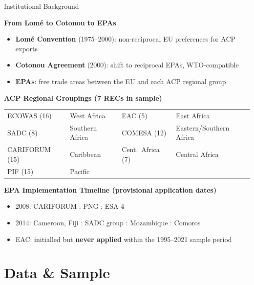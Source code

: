 \documentclass[aspectratio=169,11pt]{beamer}
\begin{document}
\begin{frame}{Institutional Background}

    \textbf{From Lom\'{e} to Cotonou to EPAs}
    \begin{itemize}
        \item \textbf{Lom\'{e} Convention} (1975--2000): non-reciprocal EU preferences for ACP exports
        \item \textbf{Cotonou Agreement} (2000): shift to reciprocal EPAs, WTO-compatible
        \item \textbf{EPAs}: free trade areas between the EU and each ACP regional group
    \end{itemize}

    \medskip

    \textbf{ACP Regional Groupings (7 RECs in sample)}

    \smallskip
    {\small
    \begin{tabular}{ll@{\qquad}ll}
        ECOWAS (16)    & West Africa      & EAC (5)       & East Africa \\
        SADC (8)       & Southern Africa  & COMESA (12)   & Eastern/Southern Africa \\
        CARIFORUM (15) & Caribbean        & Cent.\ Africa (7) & Central Africa \\
        PIF (15)       & Pacific          & & \\
    \end{tabular}}

    \medskip

    \textbf{EPA Implementation Timeline (provisional application dates)}
    \begin{itemize}
        \item 2008: CARIFORUM : PNG : ESA-4
        \item 2014: Cameroon, Fiji : SADC group : Mozambique : Comoros
        \item EAC: initialled but \textbf{never applied} within the 1995--2021 sample period
    \end{itemize}

\end{frame}

\section{Data \& Sample}
\end{document}
